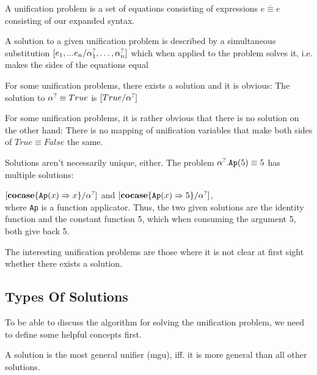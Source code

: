 \documentclass[twoside,12pt,a4paper]{article}
\begin{document}
\begin{definition}
    A unification problem is a set of equations consisting of expressions $\overline{e \equiv e}$ consisting of our expanded syntax.
\end{definition}

\begin{definition}[Solution]
    A solution to a given unification problem is described by a simultaneous substitution $[e_1,...e_n / \alpha^?_1, \dots, \alpha^?_n]$
    which when applied to the problem solves it, i.e. makes the sides of the equations equal %
\end{definition}


For some unification problems, there exists a solution and it is obvious:
The solution to $\alpha^? \equiv True$ is $[True/\alpha^?]$

For some unification problems, it is rather obvious that there is no solution on the other hand:
There is no mapping of unification variables that make both sides of $True \equiv False$ the same.

Solutions aren't necessarily unique, either. The problem $\alpha^?.\texttt{Ap}(5) \equiv 5$ has multiple solutions: 

$[\textbf{cocase}\{\texttt{Ap}(x)\Rightarrow x\} / \alpha^?]$ and $[\textbf{cocase}\{\texttt{Ap}(x)\Rightarrow 5\} / \alpha^?]$,\\
where \texttt{Ap} is a function applicator. 
Thus, the two given solutions are the identity function and the constant function 5, which when consuming the argument 5, both give back 5.

The interesting unification problems are those where it is not clear at first sight whether there exists a solution.




\subsection{Types Of Solutions} %

To be able to discuss the algorithm for solving the unification problem, we need to define some helpful concepts first.
    

\begin{definition}
    A solution is the most general unifier (mgu), iff. it is more general than all other solutions.
\end{definition} 
\end{document}
